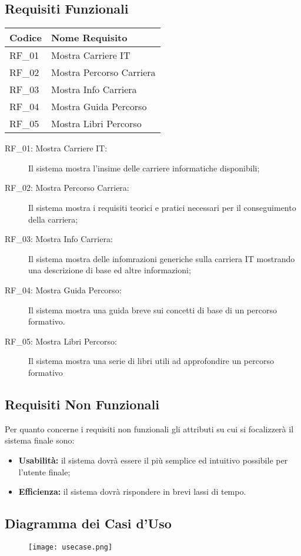 \subsection{Requisiti Funzionali}
\begin{center}
\begin{tabular}{|l|l|}
\hline
\textbf{Codice} & \textbf{Nome Requisito}\\ 
\hline
RF\_01 & Mostra Carriere IT\\
\hline 
RF\_02 & Mostra Percorso Carriera\\
\hline
RF\_03 & Mostra Info Carriera\\
\hline
RF\_04 & Mostra Guida Percorso\\
\hline
RF\_05 & Mostra Libri Percorso \\
\hline
\end{tabular}
\end{center}
\begin{description}
 \item [RF\_01: Mostra Carriere IT:] Il sistema mostra l'insime delle carriere informatiche disponibili;
 \item[RF\_02: Mostra Percorso Carriera:] Il sistema mostra i requisiti teorici e pratici necessari per il conseguimento della carriera;
 \item[RF\_03: Mostra Info Carriera:] Il sistema mostra delle infomrazioni generiche sulla carriera IT mostrando una descrizione di base ed altre informazioni;
 \item[RF\_04: Mostra Guida Percorso:] Il sistema mostra una guida breve sui concetti di base di un percorso formativo.
 \item[RF\_05: Mostra Libri Percorso:] Il sistema mostra una serie di libri utili ad approfondire un percorso formativo
\end{description}
\subsection{Requisiti Non Funzionali}
Per quanto concerne i requisiti non funzionali gli attributi su cui si focalizzerà il sistema finale sono:
\begin{itemize}
 \item \textbf{Usabilità:} il sistema dovrà essere il più semplice ed intuitivo possibile per l'utente finale;
 \item \textbf{Efficienza:} il sistema dovrà rispondere in brevi lassi di tempo.
\end{itemize}
\subsection{Diagramma dei Casi d'Uso}
\begin{figure}[H]
 \texttt{[image: usecase.png]}
\end{figure}
